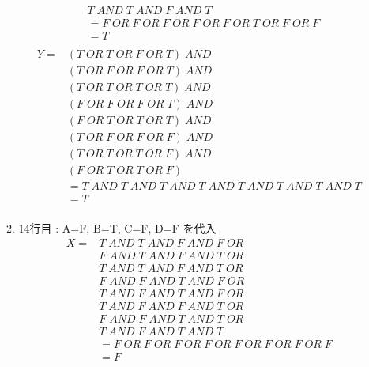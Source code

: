 \documentclass[dvipdfmx,10pt, a4j]{jarticle}
\theoremstyle{definition}
\begin{document}
\begin{enumerate}[i)]
\begin{enumerate}[1)]
\begin{align*}
                &T\; AND\; T\; AND\; F\; AND\; T\\
                &= F\; OR\; F\; OR\; F\; OR\; F\; OR\; F\; OR\; T\; OR\; F\; OR\; F\\
                &= T\\
            \end{align*}
            \begin{align*}
                Y = & (T\; OR\; T\; OR\; F\; OR\; T) \; AND\\
                & (T\; OR\; F\; OR\; F\; OR\; T)\; AND\\
                & (T\; OR\; T\; OR\; T\; OR\; T)\; AND\\
                & (F\; OR\; F\; OR\; F\; OR\; T)\; AND\\
                & (F\; OR\; T\; OR\; T\; OR\; T)\; AND\\
                & (T\; OR\; F\; OR\; F\; OR\; F)\; AND\\
                & (T\; OR\; T\; OR\; T\; OR\; F)\; AND\\
                & (F\; OR\; T\; OR\; T\; OR\; F)\\
                &= T\; AND\; T\; AND\; T\; AND\; T\; AND\; T\; AND\; T\; AND\; T\; AND\; T\\
                &= T\\
            \end{align*}
            \item 14行目 : A=F, B=T, C=F, D=F を代入\\
            \begin{align*}
                X = &T\; AND\; T\; AND\; F\; AND\; F\; OR\\
                &F\; AND\; T\; AND\; F\; AND\; T\; OR\\
                &T\; AND\; T\; AND\; F\; AND\; T\; OR\\
                &F\; AND\; F\; AND\; T\; AND\; F\; OR\\
                &T\; AND\; F\; AND\; T\; AND\; F\; OR\\
                &T\; AND\; F\; AND\; F\; AND\; T\; OR\\
                &F\; AND\; F\; AND\; T\; AND\; T\; OR\\
                &T\; AND\; F\; AND\; T\; AND\; T\\
                &= F\; OR\; F\; OR\; F\; OR\; F\; OR\; F\; OR\; F\; OR\; F\; OR\; F\\
                &= F\\

\end{align*}
\end{enumerate}
\end{enumerate}
\end{document}
